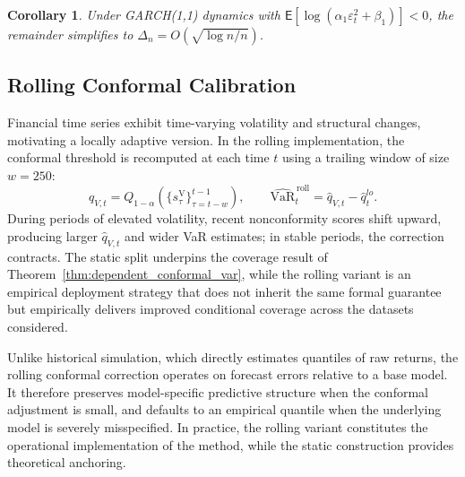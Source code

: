 \documentclass[preprint,11pt,authoryear]{elsarticle}
\newtheorem{corollary}[theorem]{Corollary}
\newcommand{\VaR}{\mathrm{VaR}}
\newcommand{\E}{\mathsf{E}}
\newcommand{\1}{\boldsymbol{1}}
\begin{document}
	\begin{corollary}
		\label{cor:garch_conformal_var}
		Under GARCH(1,1) dynamics with
		$\E[\log(\alpha_1\varepsilon_t^2 + \beta_1)] < 0$, the
		remainder simplifies to
		$\Delta_n = O(\sqrt{\log n / n})$.
	\end{corollary}
	
	\subsection{Rolling Conformal Calibration}
	\label{sec:rolling_method}
	
	Financial time series exhibit time-varying volatility and
	structural changes, motivating a locally adaptive version. In
	the rolling implementation, the conformal threshold is
	recomputed at each time $t$ using a trailing window of size
	$w = 250$:
	\begin{equation}
		\hat{q}_{V,t} = Q_{1-\alpha}\!\left(
		\{s_\tau^{\mathrm{V}}\}_{\tau=t-w}^{t-1}\right),
		\qquad
		\widehat{\VaR}_t^{\,\mathrm{roll}}
		= \hat{q}_{V,t} - \hat{q}_t^{lo}.
		\label{eq:var_roll}
	\end{equation}
	During periods of elevated volatility, recent nonconformity
	scores shift upward, producing larger $\hat{q}_{V,t}$ and
	wider VaR estimates; in stable periods, the correction
	contracts. The static split underpins the coverage result of
	Theorem~\ref{thm:dependent_conformal_var}, while the rolling
	variant is an empirical deployment strategy that does not
	inherit the same formal guarantee but empirically delivers
	improved conditional coverage across the datasets considered.

	Unlike historical simulation, which directly estimates quantiles of raw returns, the rolling conformal correction operates on forecast errors relative to a base model. It therefore preserves model-specific predictive structure when the conformal adjustment is small, and defaults to an empirical quantile when the underlying model is severely misspecified.
	In practice, the rolling variant constitutes the operational implementation of the method, while the static construction provides theoretical anchoring.
\end{document}
